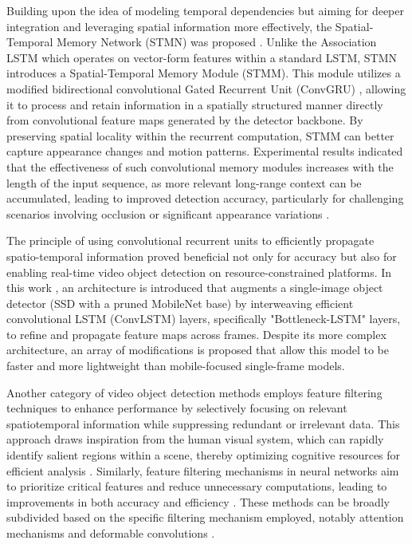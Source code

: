 Building upon the idea of modeling temporal dependencies but aiming for deeper integration and leveraging spatial information more effectively, the Spatial-Temporal Memory Network (STMN) was proposed \cite{xiaoVideoObjectDetection2018}. Unlike the Association LSTM which operates on vector-form features within a standard LSTM, STMN introduces a Spatial-Temporal Memory Module (STMM). This module utilizes a modified bidirectional convolutional Gated Recurrent Unit (ConvGRU) \cite{ballasDelvingDeeperConvolutional2016}, allowing it to process and retain information in a spatially structured manner directly from convolutional feature maps generated by the detector backbone. By preserving spatial locality within the recurrent computation, STMM can better capture appearance changes and motion patterns. Experimental results indicated that the effectiveness of such convolutional memory modules increases with the length of the input sequence, as more relevant long-range context can be accumulated, leading to improved detection accuracy, particularly for challenging scenarios involving occlusion or significant appearance variations \cite{xiaoVideoObjectDetection2018}.

The principle of using convolutional recurrent units to efficiently propagate spatio-temporal information proved beneficial not only for accuracy but also for enabling real-time video object detection on resource-constrained platforms. In this work \cite{liuMobileVideoObject2018}, an architecture is introduced that augments a single-image object detector (SSD with a pruned MobileNet base) by interweaving efficient convolutional LSTM (ConvLSTM) \cite{} layers, specifically "Bottleneck-LSTM" layers, to refine and propagate feature maps across frames. Despite its more complex architecture, an array of modifications is proposed that allow this model to be faster and more lightweight than mobile-focused single-frame models.


Another category of video object detection methods employs feature filtering techniques to enhance performance by selectively focusing on relevant spatiotemporal information while suppressing redundant or irrelevant data. This approach draws inspiration from the human visual system, which can rapidly identify salient regions within a scene, thereby optimizing cognitive resources for efficient analysis \cite{}. Similarly, feature filtering mechanisms in neural networks aim to prioritize critical features and reduce unnecessary computations, leading to improvements in both accuracy and efficiency \cite{jiaoNewGenerationDeep2022}. These methods can be broadly subdivided based on the specific filtering mechanism employed, notably attention mechanisms \cite{bahdanauNeuralMachineTranslation2016a, vaswaniAttentionAllYou2023} and deformable convolutions \cite{}.

